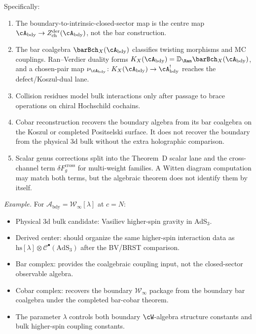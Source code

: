 \begin{conjecture}
Specifically:
\begin{enumerate}[label=\textup{(\roman*)}]
\item The boundary-to-intrinsic-closed-sector map is the centre map
$\cA_{\mathrm{bdy}}\to Z^{\mathrm{der}}_{\mathrm{ch}}(\cA_{\mathrm{bdy}})$,
not the bar construction.
\item The bar coalgebra
$\barBch_X(\cA_{\mathrm{bdy}})$ classifies twisting morphisms and MC
couplings.  Ran--Verdier duality forms
$K_X(\cA_{\mathrm{bdy}})=\mathbb D_{\Ran}
\barBch_X(\cA_{\mathrm{bdy}})$, and a chosen-pair map
$\nu_{\cA_{\mathrm{bdy}}}\colon K_X(\cA_{\mathrm{bdy}})
\to\cA_{\mathrm{bdy}}^!$ reaches the defect/Koszul-dual lane.
\item Collision residues model bulk interactions only after passage
to brace operations on chiral Hochschild cochains.
\item Cobar reconstruction recovers the boundary algebra from its bar
coalgebra on the Koszul or completed Positselski surface.  It does not
recover the boundary from the physical $3$d bulk without the extra
holographic comparison.
\item Scalar genus corrections split into the Theorem~D scalar lane
and the cross-channel term
$\delta F_g^{\mathrm{cross}}$ for multi-weight families.  A Witten
diagram computation may match both terms, but the algebraic theorem
does not identify them by itself.
\end{enumerate}

\emph{Example.} For
$\mathcal{A}_{\mathrm{bdy}} = \mathcal{W}_{\infty}[\lambda]$
at $c = N$:
\begin{itemize}
\item Physical $3$d bulk candidate: Vasiliev higher-spin gravity in AdS$_3$.
\item Derived center: should organize the same higher-spin interaction
 data as $\mathrm{hs}[\lambda]\otimes\mathcal{C}^{\bullet}(\mathrm{AdS}_3)$
 after the BV/BRST comparison.
\item Bar complex: provides the coalgebraic coupling input, not the
 closed-sector observable algebra.
\item Cobar complex: recovers the boundary $\mathcal{W}_{\infty}$
 package from the boundary bar coalgebra under the completed
 bar-cobar theorem.
\item The parameter $\lambda$ controls both
 boundary $\cW$-algebra structure constants and
 bulk higher-spin coupling constants.
\end{itemize}
\end{conjecture}

